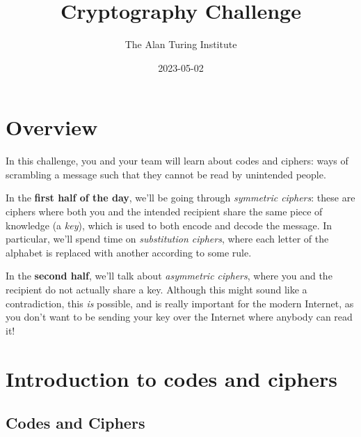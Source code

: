 \documentclass[
  letterpaper,
  DIV=11,
  numbers=noendperiod]{scrreprt}
\title{Cryptography Challenge}
\author{The Alan Turing Institute}
\date{2023-05-02}
\renewcommand*\contentsname{Table of contents}
\newcommand\contentsname{Table of contents}
\begin{document}
\maketitle
\ifdefined\Shaded\renewenvironment{Shaded}{\begin{tcolorbox}[sharp corners, enhanced, borderline west={3pt}{0pt}{shadecolor}, frame hidden, interior hidden, breakable, boxrule=0pt]}{\end{tcolorbox}}\fi

\renewcommand*\contentsname{Table of contents}
{
\hypersetup{linkcolor=}
\setcounter{tocdepth}{2}
\tableofcontents
}

\hypertarget{overview}{%
\chapter*{Overview}\label{overview}}


In this challenge, you and your team will learn about codes and ciphers:
ways of scrambling a message such that they cannot be read by unintended
people.

In the \textbf{first half of the day}, we'll be going through
\emph{symmetric ciphers}: these are ciphers where both you and the
intended recipient share the same piece of knowledge (a \emph{key}),
which is used to both encode and decode the message. In particular,
we'll spend time on \emph{substitution ciphers}, where each letter of
the alphabet is replaced with another according to some rule.

In the \textbf{second half}, we'll talk about \emph{asymmetric ciphers},
where you and the recipient do not actually share a key. Although this
might sound like a contradiction, this \emph{is} possible, and is really
important for the modern Internet, as you don't want to be sending your
key over the Internet where anybody can read it!


\hypertarget{introduction-to-codes-and-ciphers}{%
\chapter{Introduction to codes and
ciphers}\label{introduction-to-codes-and-ciphers}}

\hypertarget{codes-and-ciphers}{%
\section{Codes and Ciphers}\label{codes-and-ciphers}}
\end{document}
